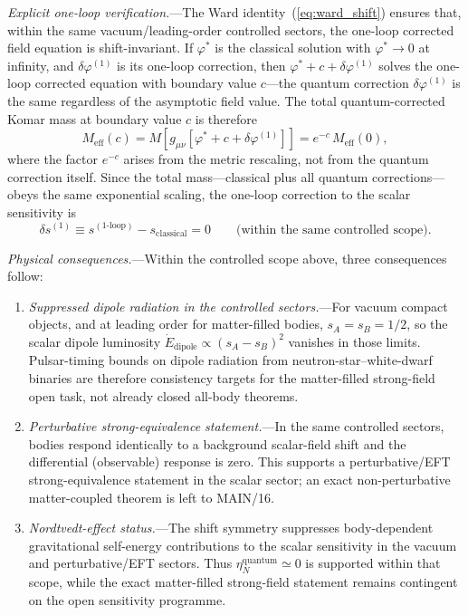 \documentclass[aps,prd,onecolumn,superscriptaddress,nofootinbib,showpacs,12pt,notitlepage]{revtex4-2}
\begin{document}
\textit{Explicit one-loop verification.}---The
Ward identity~(\ref{eq:ward_shift}) ensures that,
within the same vacuum/leading-order controlled sectors,
the one-loop corrected field equation is shift-invariant.
If $\varphi^{*}$ is the classical solution with
$\varphi^{*} \to 0$ at infinity, and
$\delta\varphi^{(1)}$ is its one-loop correction, then
$\varphi^{*} + c + \delta\varphi^{(1)}$ solves the
one-loop corrected equation with boundary value $c$---the
quantum correction $\delta\varphi^{(1)}$ is the same
regardless of the asymptotic field value.  The total
quantum-corrected Komar mass at boundary value $c$ is
therefore
\begin{equation}
  M_{\mathrm{eff}}(c) =
  M\!\left[g_{\mu\nu}\!\left[\varphi^{*} + c
    + \delta\varphi^{(1)}\right]\right]
  = e^{-c}\,M_{\mathrm{eff}}(0),
\end{equation}
where the factor $e^{-c}$ arises from the metric
rescaling, not from the quantum correction itself.
Since the total mass---classical plus all quantum
corrections---obeys the same exponential scaling, the
one-loop correction to the scalar sensitivity is
\begin{equation}\label{eq:delta_s1}
  \delta s^{(1)} \equiv
  s^{(1\text{-loop})} - s_{\mathrm{classical}} = 0
  \qquad\text{(within the same controlled scope).}
\end{equation}

\textit{Physical consequences.}---Within the controlled
scope above, three consequences follow:
\begin{enumerate}
\item \textit{Suppressed dipole radiation in the controlled
  sectors.}---For vacuum compact objects, and at leading order
  for matter-filled bodies, $s_A = s_B = 1/2$, so the scalar
  dipole luminosity
  $\dot{E}_{\mathrm{dipole}} \propto (s_A - s_B)^2$
  vanishes in those limits.  Pulsar-timing bounds on dipole
  radiation from neutron-star--white-dwarf binaries are
  therefore consistency targets for the matter-filled
  strong-field open task, not already closed all-body
  theorems.
\item \textit{Perturbative strong-equivalence statement.}---In
  the same controlled sectors, bodies respond identically to a
  background scalar-field shift and the differential
  (observable) response is zero.  This supports a
  perturbative/EFT strong-equivalence statement in the scalar
  sector; an exact non-perturbative matter-coupled theorem is
  left to MAIN/16.
\item \textit{Nordtvedt-effect status.}---The shift symmetry
  suppresses body-dependent gravitational self-energy
  contributions to the scalar sensitivity in the vacuum and
  perturbative/EFT sectors.  Thus
  $\eta_N^{\mathrm{quantum}} \simeq 0$ is supported within that
  scope, while the exact matter-filled strong-field statement
  remains contingent on the open sensitivity programme.
\end{enumerate}
\end{document}
